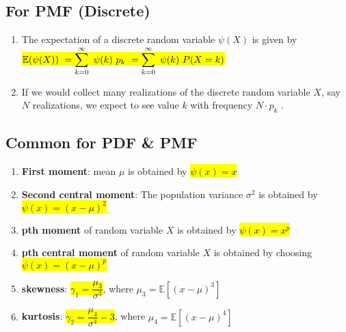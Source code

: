 \subsection{For PMF (Discrete)}

\begin{enumerate}
    \item The expectation of a discrete random variable $\psi(X)$ is given by 
    \hfill \cite{statistics/book/Statistics-for-Data-Scientists/Maurits-Kaptein}
    \\[0.2cm]
    \colorbox{yellow}{$
        \mathbb{E} (\psi(X)) \ 
        = \dsum^{\infty}_{k=0}\ \psi(k)\ p _k \
        = \dsum^{\infty}_{k=0}\ \psi(k)\ P(X = k)
    $}
    \hfill \cite{statistics/book/Statistics-for-Data-Scientists/Maurits-Kaptein}

    \item If we would collect many realizations of the discrete random variable $X$, say $N$ realizations, we expect to see value $k$ with frequency $N \cdot p _k$ .
    \hfill \cite{statistics/book/Statistics-for-Data-Scientists/Maurits-Kaptein}
\end{enumerate}

\subsection{Common for PDF \& PMF}

\begin{enumerate}
    \item \textbf{First moment}: mean $\mu$ is obtained by \colorbox{yellow}{$\psi(x)=x$}
    \hfill \cite{statistics/book/Statistics-for-Data-Scientists/Maurits-Kaptein}

    \item \textbf{Second central moment}: The population variance $\sigma^ 2$ is obtained by \colorbox{yellow}{$\psi(x)=(x -\mu)^2$}
    \hfill \cite{statistics/book/Statistics-for-Data-Scientists/Maurits-Kaptein}

    \item \textbf{pth moment} of random variable $X$ is obtained by \colorbox{yellow}{$\psi(x) = x^p$}
    \hfill \cite{statistics/book/Statistics-for-Data-Scientists/Maurits-Kaptein}

    \item \textbf{pth central moment} of random variable $X$ is obtained by choosing \colorbox{yellow}{$\psi(x) = (x - \mu)^p$}
    \hfill \cite{statistics/book/Statistics-for-Data-Scientists/Maurits-Kaptein}

    \item \textbf{skewness}: \colorbox{yellow}{$\gamma_1 = \dfrac{\mu_3}{\sigma^3}$}, where $\mu_3 = \mathbb{E}[(x-\mu)^3]$
    \hfill \cite{statistics/book/Statistics-for-Data-Scientists/Maurits-Kaptein}

    \item \textbf{kurtosis}: \colorbox{yellow}{$\gamma_2 = \dfrac{\mu_4}{\sigma^4} - 3$}, where $\mu_4 = \mathbb{E}[(x-\mu)^4]$
    \hfill \cite{statistics/book/Statistics-for-Data-Scientists/Maurits-Kaptein}
\end{enumerate}

